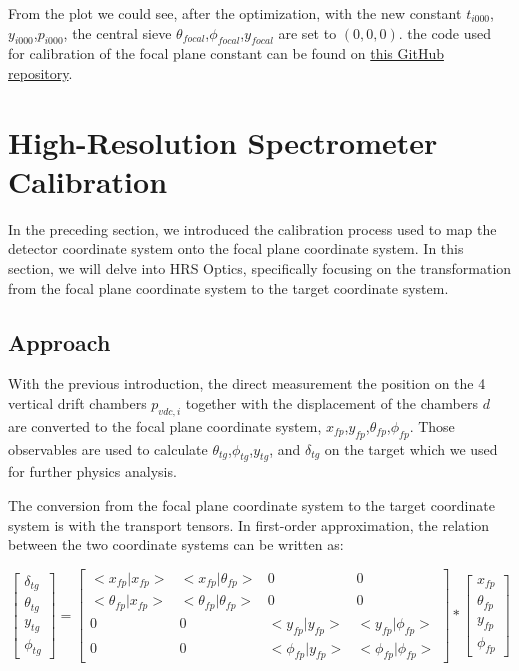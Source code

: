 From the plot we could see, after the optimization, with the new constant $t_{i000}$,$y_{i000}$,$p_{i000}$, the central sieve $\theta_{focal}$,$\phi_{focal}$,$y_{focal}$ are set to $(0,0,0)$. the code used for calibration of the focal plane constant can be found on  \href{https://github.com/Jiansiyu/GeneralScripts/blob/master/vdcConstantOpt}{this GitHub repository}.


\section{High-Resolution Spectrometer Calibration}

In the preceding section, we introduced the calibration process used to map the detector coordinate system onto the focal plane coordinate system. In this section, we will delve into HRS Optics, specifically focusing on the transformation from the focal plane coordinate system to the target coordinate system.

\subsection{Approach}

With the previous introduction, the direct measurement the position on the 4 vertical drift chambers $p_{vdc,i}$ together with the displacement of the chambers $d$ are converted to the focal plane coordinate system, $x_{fp}$,$y_{fp}$,$\theta_{fp}$,$\phi_{fp}$. Those observables are used to calculate $\theta_{tg}$,$\phi_{tg}$,$y_{tg}$, and $\delta_{tg}$ on the target which we used for further physics analysis. 

The conversion from the focal plane coordinate system to the target coordinate system is with the transport tensors. In first-order approximation, the relation between the two coordinate systems can be written as:

\begin{equation}
\begin{bmatrix}
\delta_{tg} \\
\theta_{tg} \\
y_{tg} \\
\phi_{tg}
\end{bmatrix} = \begin{bmatrix}
    <x_{fp}|x_{fp}> & <x_{fp}|\theta_{fp}> & 0 & 0 \\
    <\theta_{fp}|x_{fp}> & <\theta_{fp}|\theta_{fp}> & 0 & 0 \\
    0 & 0 & <y_{fp}|y_{fp}> & <y_{fp}|\phi_{fp}>  \\
    0 & 0 & <\phi_{fp}|y_{fp}> & <\phi_{fp}|\phi_{fp}>  
\end{bmatrix} * \begin{bmatrix}
    x_{fp} \\
    \theta_{fp} \\
    y_{fp} \\
    \phi_{fp}
\end{bmatrix}
\end{equation}


